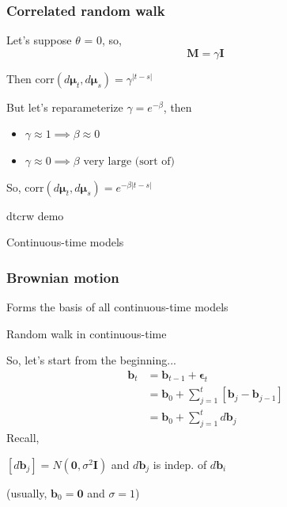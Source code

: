 \documentclass[36pt,handout]{beamer}
\newcommand{\ft}[1]{\frametitle{#1}}
\newcommand{\bb}{\mathbf{b}}
\newcommand{\bmu}{\boldsymbol{\mu}}
\newcommand{\be}{\boldsymbol{\epsilon}}
\begin{document}

\begin{frame}
\ft{Correlated random walk}
Let's suppose $\theta$ = 0, so,
$$\mathbf{M} = \gamma \mathbf{I}$$
\medskip

Then $\mbox{corr}(d\bmu_t, d\bmu_s) = \gamma^{|t-s|}$
\bigskip

But let's reparameterize $\gamma = e^{-\beta}$, then 
\begin{itemize}
\item $\gamma \approx 1 \implies \beta \approx 0$ 
\item $\gamma \approx 0 \implies \beta \mbox{ very large (sort of)}$ 
\end{itemize}

So, $\mbox{corr}(d\bmu_t, d\bmu_s) = e^{-\beta|t-s|}$

\end{frame}


\begin{frame}
dtcrw demo
\end{frame}


{
\begin{frame}
\textcolor{noaaturq}{\Huge Continuous-time models}
\end{frame}
}


\begin{frame}
\ft{Brownian motion}
Forms the basis of all continuous-time models\medskip

Random walk in continuous-time \medskip

So, let's start from the beginning...
$$
\begin{aligned}
\bb_t &= \bb_{t-1} + \be_t \\
&= \bb_0 + \sum_{j=1}^{t}\left[\bb_j-\bb_{j-1}\right] \\
&= \bb_0 + \sum_{j=1}^{t} d\bb_j
\end{aligned}
$$
Recall,

$[d\bb_j] = N(\mathbf{0},\sigma^2\mathbf{I})$ and $d\bb_j$ is indep. of $d\bb_i$

(usually, $\bb_0 = \mathbf{0}$ and $\sigma=1$)

\end{frame}

\end{document}
